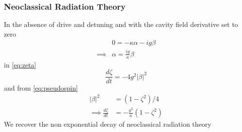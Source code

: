 \subsubsection{Neoclassical Radiation Theory}
In the absence of drive and detuning and with the cavity field derivative set to zero
\begin{align}
  & 0 = -\kappa \alpha - ig \beta \\
  \implies & \alpha = \frac{ig}{\kappa} \beta
\end{align}
in \cref{eq:zeta}
\begin{equation}
  \frac{d \zeta}{dt} = -4 g^2 |\beta|^2
\end{equation}
and from \cref{eq:pseudospin}
\begin{align}
   |\beta|^2 &= (1-\zeta^2)/4 \\
\implies \frac{d \zeta}{dt} &= -\frac{g^2}{\kappa} (1-\zeta^2)
\end{align}
We recover the non exponential decay of neoclassical radiation theory
